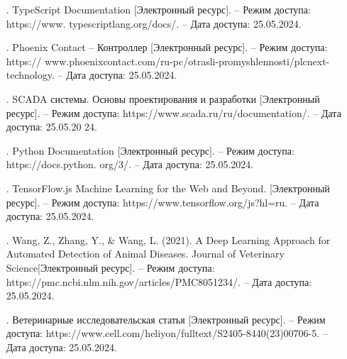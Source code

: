 {\begin{itemize}[leftmargin=2.15cm, labelwidth=0.65cm, labelsep=0.0cm]
\item[\theimagecntr.] TypeScript Documentation [Электронный ресурс]. – Режим доступа: https://www. typescriptlang.org/docs/. – Дата доступа: 25.05.2024.
\addtocounter{imagecntr}{1}

\item[\theimagecntr.] Phoenix Contact – Контроллер [Электронный ресурс]. – Режим доступа: https:// www.phoenixcontact.com/ru-pc/otrasli-promyshlennosti/plcnext-technology. – Дата доступа: 25.05.2024.
\addtocounter{imagecntr}{1}

\item[\theimagecntr.] SCADA системы. Основы проектирования и разработки [Электронный ресурс]. – Режим доступа: https://www.scada.ru/ru/documentation/. – Дата доступа: 25.05.20 24.
\addtocounter{imagecntr}{1}

\item[\theimagecntr.] Python Documentation [Электронный ресурс]. – Режим доступа: https://docs.python. org/3/. – Дата доступа: 25.05.2024.
\addtocounter{imagecntr}{1}

\item[\theimagecntr.] TensorFlow.js Machine Learning for the Web and Beyond. [Электронный ресурс]. – Режим доступа: https://www.tensorflow.org/js?hl=ru. – Дата доступа: 25.05.2024.
\addtocounter{imagecntr}{1}

\item[\theimagecntr.] Wang, Z., Zhang, Y., & Wang, L. (2021). A Deep Learning Approach for Automated Detection of Animal Diseases. Journal of Veterinary Science[Электронный ресурс]. – Режим доступа: https://pmc.ncbi.nlm.nih.gov/articles/PMC8051234/. – Дата доступа: 25.05.2024.
\addtocounter{imagecntr}{1}

\item[\theimagecntr.] Ветеринарные исследовательская статья [Электронный ресурс]. – Режим доступа: https://www.cell.com/heliyon/fulltext/S2405-8440(23)00706-5. – Дата доступа: 25.05.2024.
\addtocounter{imagecntr}{1}

\end{itemize}

}